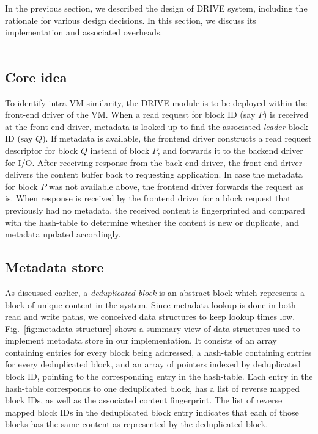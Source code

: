 
In the previous section, we described the design of DRIVE system, 
including the rationale for various design decisions. In this section, we
discuss its implementation and associated overheads.
\\
\\
\subsection{Core idea}
To identify intra-VM similarity, 
the DRIVE module is to be deployed
within the front-end driver of the VM. 
When a read request for block ID (say $P$) is 
received at the front-end driver,
metadata is looked up to find the associated \textit{leader} 
block ID (say $Q$).
If metadata is available, the frontend 
driver constructs a read request
descriptor for block $Q$ instead of block $P$, 
and forwards it to the backend driver for I/O. 
After receiving response from the back-end driver, the 
front-end driver delivers the content buffer back 
to requesting application.
In case the metadata for block $P$ was not available above, 
the frontend driver forwards the request as is.
When response is received by the frontend driver 
for a block request that previously had no metadata,
the received content is fingerprinted
and compared with the hash-table 
to determine whether the content is new or duplicate, 
and metadata updated accordingly.

\subsection{Metadata store}
As discussed earlier, a \textit{deduplicated block}
is an abstract block which represents a block of unique content in the system.
Since metadata lookup is done in both read and write paths,
we conceived data structures to keep lookup times low.
Fig.~\ref{fig:metadata-structure} shows a summary view of
data structures used to implement metadata store in our implementation.
It consists of an array containing entries for every block being
addressed, a hash-table containing entries for every deduplicated block, 
and an array of pointers indexed by deduplicated block ID, pointing to
the corresponding entry in the hash-table.
Each entry in the hash-table corresponds to 
one deduplicated block,
has a list of reverse mapped block IDs, as well as the associated 
content fingerprint.
The list of reverse mapped block IDs in the deduplicated block entry 
indicates that each of those 
blocks has the same content as represented by the deduplicated block.

